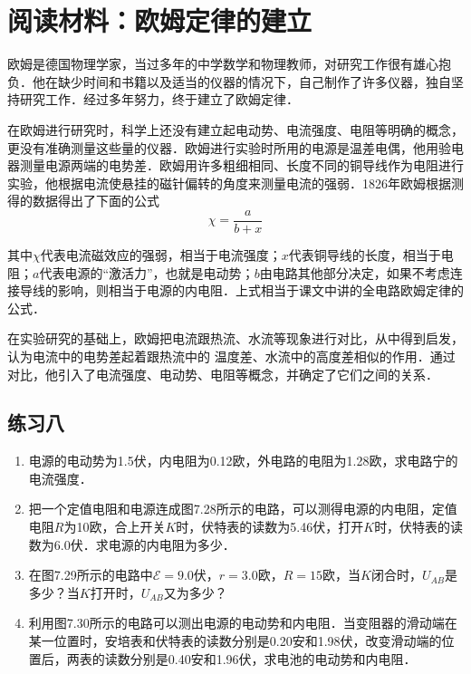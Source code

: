 \section*{阅读材料：欧姆定律的建立}

欧姆是德国物理学家，当过多年的中学数学和物理教师，对研究工作很有雄心抱负．他在缺少时间和书籍以及适当的仪器的情况下，自己制作了许多仪器，独自坚持研究工作．经过多年努力，终于建立了欧姆定律．

在欧姆进行研究时，科学上还没有建立起电动势、电流强度、电阻等明确的概念，更没有准确测量这些量的仪器．欧姆进行实验时所用的电源是温差电偶，他用验电器测量电源两端的电势差．欧姆用许多粗细相同、长度不同的铜导线作为电阻进行实验，他根据电流使悬挂的磁针偏转的角度来测量电流的强弱．1826年欧姆根据测得的数据得出了下面的公式
\[\chi=\frac{a}{b+x}\]

其中$\chi$代表电流磁效应的强弱，相当于电流强度；$x$代表铜导线的长度，相当于电阻；$a$代表电源的“激活力”，也就是电动势；$b$由电路其他部分决定，如果不考虑连接导线的影响，则相当于电源的内电阻．上式相当于课文中讲的全电路欧姆定律的公式．

在实验研究的基础上，欧姆把电流跟热流、水流等现象进行对比，从中得到启发，认为电流中的电势差起着跟热流中的
温度差、水流中的高度差相似的作用．通过对比，他引入了电流强度、电动势、电阻等概念，并确定了它们之间的关系．


\subsection*{练习八}
\begin{enumerate}
    \item 电源的电动势为1.5伏，内电阻为0.12欧，外电路的电阻为1.28欧，求电路宁的电流强度．
    \item 把一个定值电阻和电源连成图7.28所示的电路，可以测得电源的内电阻，定值电阻$R$为10欧，合上开关$K$时，伏特表的读数为5.46伏，打开$K$时，伏特表的读数为6.0伏．求电源的内电阻为多少．
    \item 在图7.29所示的电路中$\mathcal{E}=9.0$伏，$r=3.0$欧，$R=15$欧，当$K$闭合时，$U_{AB}$是多少？当$K$打开时，$U_{AB}$又为多少？
    \item 利用图7.30所示的电路可以测出电源的电动势和内电阻．当变阻器的滑动端在某一位置时，安培表和伏特表的读数分别是0.20安和1.98伏，改变滑动端的位置后，两表的读数分别是0.40安和1.96伏，求电池的电动势和内电阻．

\end{enumerate}

